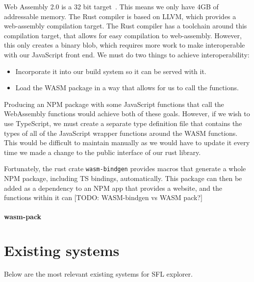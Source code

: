 Web Assembly 2.0 is a 32 bit target~\cite{WebAssemblyCoreSpecification2}. This means we only have 4GB of addressable memory. The Rust compiler is based on LLVM, which provides a web-assembly compilation target. The Rust compiler has a toolchain around this compilation target, that allows for easy compilation to web-assembly. However, this only creates a binary blob, which requires more work to make interoperable with our JavaScript front end. We must do two things to achieve interoperability:
\begin{itemize}
    \item Incorporate it into our build system so it can be served with it.
    \item Load the WASM package in a way that allows for us to call the functions.
\end{itemize}
Producing an NPM package with some JavaScript functions that call the WebAssembly functions would achieve both of these goals. However, if we wish to use TypeScript, we must create a separate type definition file that contains the types of all of the JavaScript wrapper functions around the WASM functions. This would be difficult to maintain manually as we would have to update it every time we made a change to the public interface of our rust library. 

Fortunately, the rust crate \verb|wasm-bindgen| provides macros that generate a whole NPM package, including TS bindings, automatically. This package can then be added as a dependency to an NPM app that provides a website, and the functions within it can [TODO: WASM-bindgen vs WASM pack?]

\paragraph{wasm-pack}
\label{bg:wasm-pack}

\section{Existing systems}
Below are the most relevant existing systems for SFL explorer. 

